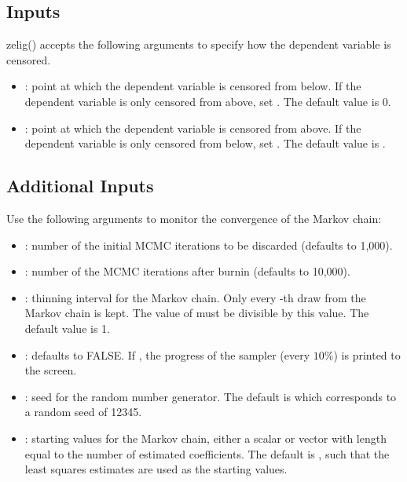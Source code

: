 \documentclass[letterpaper,10pt,english]{sphinxmanual}
\begin{document}
\subsection{Inputs}
\label{vignette:id118}
zelig() accepts the following arguments to specify how the dependent
variable is censored.
\begin{itemize}
\item {} 
: point at which the dependent variable is censored from
below. If the dependent variable is only censored from above, set
. The default value is 0.

\item {} 
: point at which the dependent variable is censored from
above. If the dependent variable is only censored from below, set
. The default value is .

\end{itemize}


\subsection{Additional Inputs}
\label{vignette:id119}
Use the following arguments to monitor the convergence of the Markov
chain:
\begin{itemize}
\item {} 
: number of the initial MCMC iterations to be discarded
(defaults to 1,000).

\item {} 
: number of the MCMC iterations after burnin (defaults to
10,000).

\item {} 
: thinning interval for the Markov chain. Only every
-th draw from the Markov chain is kept. The value of 
must be divisible by this value. The default value is 1.

\item {} 
: defaults to FALSE. If , the progress of the
sampler (every \(10\%\)) is printed to the screen.

\item {} 
: seed for the random number generator. The default is 
which corresponds to a random seed of 12345.

\item {} 
: starting values for the Markov chain, either a scalar
or vector with length equal to the number of estimated coefficients.
The default is , such that the least squares estimates are used
as the starting values.

\end{itemize}
\end{document}
